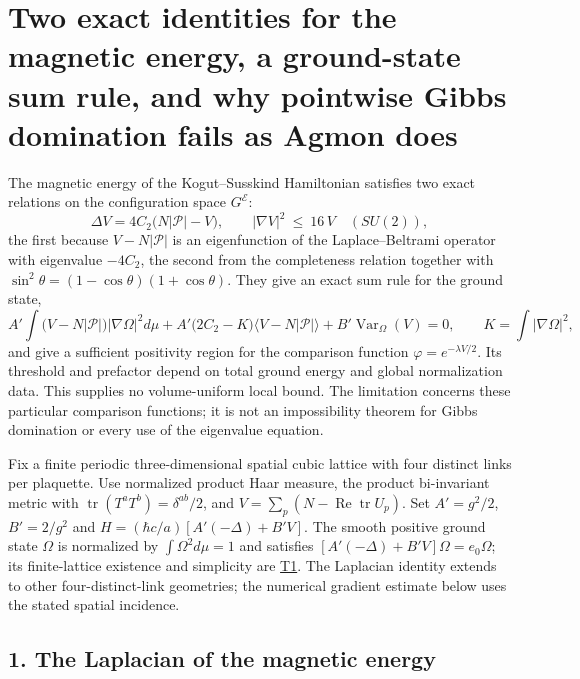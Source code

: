 \documentclass[11pt,a4paper]{article}
\begin{document}
\hypertarget{two-exact-identities-for-the-magnetic-energy-a-ground-state-sum-rule-and-why-pointwise-gibbs-domination-fails-as-agmon-does}{%
\section{Two exact identities for the magnetic energy, a ground-state
sum rule, and why pointwise Gibbs domination fails as Agmon
does}\label{two-exact-identities-for-the-magnetic-energy-a-ground-state-sum-rule-and-why-pointwise-gibbs-domination-fails-as-agmon-does}}

The magnetic energy of the Kogut--Susskind Hamiltonian satisfies two
exact relations on the configuration space \(G^{\mathcal E}\):
\[\Delta V=4C_2\big(N|\mathcal P|-V\big),
\qquad
\big|\nabla V\big|^2\ \le\ 16\,V\quad(SU(2)),\] the first because
\(V-N|\mathcal P|\) is an eigenfunction of the Laplace--Beltrami
operator with eigenvalue \(-4C_2\), the second from the completeness
relation together with \(\sin^2\theta=(1-\cos\theta)(1+\cos\theta)\).
They give an exact sum rule for the ground state,
\[A'\!\int\!\big(V-N|\mathcal P|\big)\big|\nabla\Omega\big|^2d\mu
+A'\big(2C_2-K\big)\big\langle V-N|\mathcal P|\big\rangle
+B'\operatorname{Var}_\Omega(V)=0,
\qquad K=\!\int\!|\nabla\Omega|^2,\] and give a sufficient positivity
region for the comparison function \(\varphi=e^{-\lambda V/2}\). Its
threshold and prefactor depend on total ground energy and global
normalization data. This supplies no volume-uniform local bound. The
limitation concerns these particular comparison functions; it is not an
impossibility theorem for Gibbs domination or every use of the
eigenvalue equation.

Fix a finite periodic three-dimensional spatial cubic lattice with four
distinct links per plaquette. Use normalized product Haar measure, the
product bi-invariant metric with
\(\operatorname{tr}(T^aT^b)=\delta^{ab}/2\), and
\(V=\sum_p(N-\operatorname{Re}\operatorname{tr}U_p)\). Set \(A'=g^2/2\),
\(B'=2/g^2\) and \(H=(\hbar c/a)[A'(-\Delta)+B'V]\). The smooth positive
ground state \(\Omega\) is normalized by \(\int\Omega^2d\mu=1\) and
satisfies \([A'(-\Delta)+B'V]\Omega=e_0\Omega\); its finite-lattice
existence and simplicity are \href{mass-gap-obligations-lattice.md}{T1}.
The Laplacian identity extends to other four-distinct-link geometries;
the numerical gradient estimate below uses the stated spatial incidence.

\hypertarget{the-laplacian-of-the-magnetic-energy}{%
\subsection{1. The Laplacian of the magnetic
energy}\label{the-laplacian-of-the-magnetic-energy}}
\end{document}
